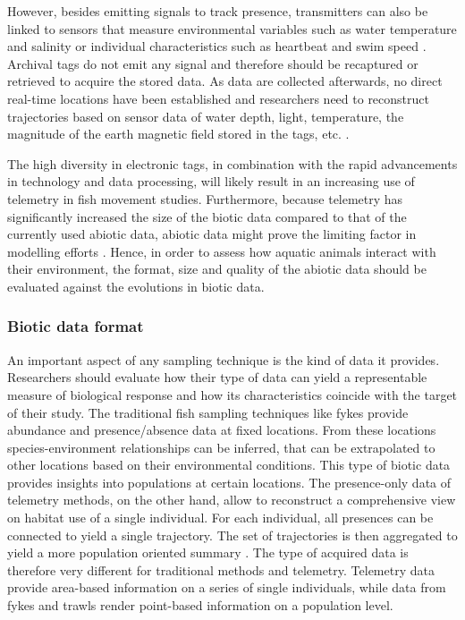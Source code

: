 \documentclass[12pt,authoryear]{elsarticle}
\begin{document}
However, besides emitting signals to track presence, transmitters can also be linked to sensors that measure  environmental variables such as water temperature and salinity or individual characteristics such as heartbeat and swim speed \citep{Thorstad2013}. Archival tags do not emit any signal and therefore should be recaptured or retrieved to acquire the stored data. As data are collected afterwards, no direct real-time locations have been established and researchers need to reconstruct trajectories based on sensor data of water depth, light, temperature, the magnitude of the earth magnetic field stored in the tags, etc. \citep{Thorstad2013,Whoriskey2016,Aarestrup2009}. 

The high diversity in electronic tags, in combination with the rapid advancements in technology and data processing, will likely result in an increasing use of telemetry in fish movement studies. Furthermore, because telemetry has significantly increased the size of the biotic data compared to that of the currently used abiotic data, abiotic data might prove the limiting factor in modelling efforts \citep{Hussey2015}. Hence, in order to assess how aquatic animals interact with their environment, the format, size and quality of the abiotic data should be evaluated against the evolutions in biotic data. 

\subsubsection{Biotic data format}

An important aspect of any sampling technique is the kind of data it provides. Researchers should evaluate how their type of data can yield a representable measure of biological response and how its characteristics coincide with the target of their study. The traditional fish sampling techniques like fykes provide abundance and presence/absence data at fixed locations. From these locations species-environment relationships can be inferred, that can be extrapolated to other locations based on their environmental conditions. This type of biotic data provides insights into populations at certain locations. The presence-only data of telemetry methods, on the other hand, allow to reconstruct a comprehensive view on habitat use of a single individual. For each individual, all presences can be connected to yield a single trajectory. The set of trajectories is then aggregated to yield a more population oriented summary \citep{Hefley2016,Pearce2006}. The type of acquired data is therefore very different for traditional methods and telemetry. Telemetry data provide area-based information on a series of single individuals, while data from fykes and trawls render point-based information on a population level.
\end{document}
